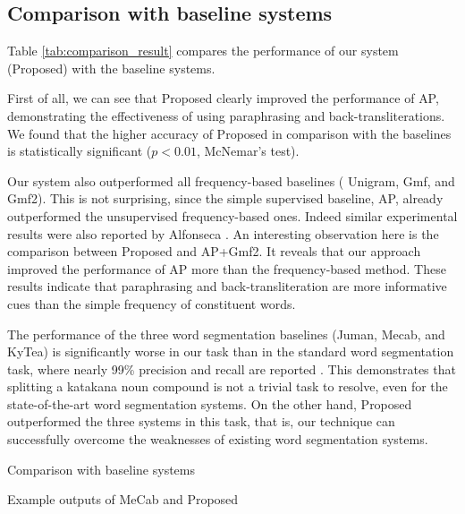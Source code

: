 \documentclass[english]{jnlp_1.4_rep}
\begin{document}
\subsection{Comparison with baseline systems}
\label{sec:compare}

Table \ref{tab:comparison_result} compares the performance of our
system ({\sc Proposed}) with the baseline systems.

First of all, we can see that {\sc Proposed} clearly improved the
performance of {\sc AP}, demon\-strating the effectiveness of using
paraphrasing and back-transliterations. We found that the higher accuracy
of {\sc Proposed} in comparison with the baselines is statistically
significant ($p<0.01$, McNemar's test).

Our system also outperformed all frequency-based baselines ({\sc
Unigram}, {\sc Gmf}, and {\sc Gmf2}). This is not surprising, since the
simple supervised baseline, {\sc AP}, already outperformed the
\linebreak
unsupervised frequency-based ones. Indeed similar experimental results
were also reported by Alfonseca . An
interesting observation here is the comparison between {\sc Proposed}
and {\sc AP+Gmf2}. It reveals that our approach improved the performance
of {\sc AP} more than the frequency-based method. These results
indicate that paraphrasing and back-transliteration are more informative
cues than the simple frequency of constituent words.

The performance of the three word segmentation baselines ({\sc Juman},
{\sc Mecab}, and {\sc KyTea}) is significantly worse in our task than in
the standard word segmentation task, where nearly 99\% precision and
recall are reported \cite{Kudo04}. This demonstrates that splitting a
katakana noun compound is not a trivial task to resolve, even for
the state-of-the-art word segmentation systems. On the other hand, {\sc
Proposed} outperformed the three systems in this task, that is, our
technique can successfully overcome the weaknesses of existing
word segmentation systems.

\begin{table}[b]
\caption{Comparison with baseline systems}
\label{tab:comparison_result}

\end{table}
\begin{table}[b]
\caption{Example outputs of {\sc MeCab} and {\sc Proposed}}
\label{tab:example}

\end{table}
\end{document}
